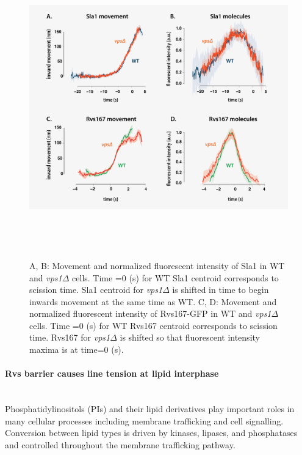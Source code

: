 	\begin{figure}[H]
	\centering
	\includegraphics[width=13cm,height=13cm,keepaspectratio]{figures/results_final/vps2}
	\caption[Tracking endocytic proteins in \textit{vps1$\Delta$} cells]
	{A, B: Movement and normalized fluorescent intensity of Sla1 in WT and \textit{vps1$\Delta$} cells. Time =0 (s) for WT Sla1 centroid corresponds to scission time. Sla1 centroid for \textit{vps1$\Delta$} is shifted in time to begin inwards movement at the same time as WT. 
		C, D: Movement and normalized fluorescent intensity of Rvs167-GFP in WT and  \textit{vps1$\Delta$} cells. Time =0 (s) for WT Rvs167 centroid corresponds to scission time. Rvs167 for \textit{vps1$\Delta$} is shifted so that fluorescent intensity maxima is at time=0 (s).
		\label{fig4_vpsdel2}}
\end{figure}



\newpage
	\paragraph{Rvs barrier causes line tension at lipid interphase}
			\mbox{}\\
Phosphatidylinositols (PIs) and their lipid derivatives play important roles in many cellular processes including membrane trafficking and cell signalling. Conversion between lipid types is driven by kinases, lipases, and phosphatases and controlled throughout the membrane trafficking pathway. 


